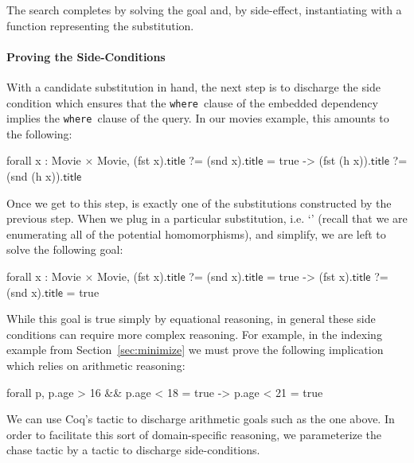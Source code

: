 \documentclass{sigplanconf}
\newcommand{\WHERE}{{\tt where}\relax\ifmmode\ \else\xspace\fi}
\newcommand{\ltac}[0]{\ensuremath{\mathcal{L}_{\mathrm{tac}}}}
\begin{document}
The search completes by solving the goal and, by side-effect, instantiating  with a function representing the substitution.

\paragraph{Proving the Side-Conditions}
With a candidate substitution in hand, the next step is to discharge the side condition which ensures that the \WHERE clause of the embedded dependency implies the \WHERE clause of the query.
In our movies example, this amounts to the following: %
\begin{coq}
forall x : Movie $\times$ Movie, (fst x).$\textsf{title}$ ?= (snd x).$\textsf{title}$ = true
     -> (fst (h x)).$\textsf{title}$ ?= (snd (h x)).$\textsf{title}$
\end{coq}

Once we get to this step,  is exactly one of the substitutions constructed by the previous step.
When we plug in a particular substitution, i.e. `' (recall that we are enumerating all of the potential homomorphisms), and simplify, we are left to solve the following goal: %
\begin{coq}
forall x : Movie $\times$ Movie, (fst x).$\textsf{title}$ ?= (snd x).$\textsf{title}$ = true
     -> (fst x).$\textsf{title}$ ?= (snd x).$\textsf{title}$ = true
\end{coq}

While this goal is true simply by equational reasoning, in general these side conditions can require more complex reasoning.
For example, in the indexing example from Section~\ref{sec:minimize} we must prove the following implication which relies on arithmetic reasoning:
\begin{coq}
forall p, p.age > 16 && p.age < 18 = true -> p.age < 21 = true
\end{coq}
We can use Coq's  tactic to discharge arithmetic goals such as the one above.
In order to facilitate this sort of domain-specific reasoning, we parameterize the chase tactic by a tactic to discharge side-conditions.
\end{document}
